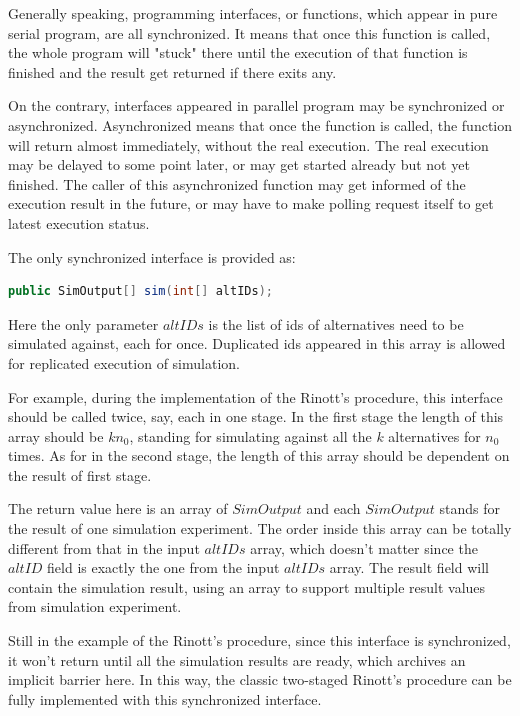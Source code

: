 Generally speaking, programming interfaces, or functions, which appear in pure serial program, are all synchronized. It means that once this function is called, the whole program will "stuck" there until the execution of that function is finished and the result get returned if there exits any.

On the contrary, interfaces appeared in parallel program may be synchronized or asynchronized. Asynchronized means that once the function is called, the function will return almost immediately, without the real execution. The real execution may be delayed to some point later, or may get started already but not yet finished. The caller of this asynchronized function may get informed of the execution result in the future, or may have to make polling request itself to get latest execution status.

The only synchronized interface is provided as:

\begin{lstlisting}[language=Java]
public SimOutput[] sim(int[] altIDs);
\end{lstlisting}

Here the only parameter $altIDs$ is the list of ids of alternatives need to be simulated against, each for once. Duplicated ids appeared in this array is allowed for replicated execution of simulation.

For example, during the implementation of the Rinott's procedure, this interface should be called twice, say, each in one stage. In the first stage the length of this array should be $kn_0$, standing for simulating against all the $k$ alternatives for $n_0$ times. As for in the second stage, the length of this array should be dependent on the result of first stage.

The return value here is an array of $SimOutput$ and each $SimOutput$ stands for the result of one simulation experiment. The order inside this array can be totally different from that in the input $altIDs$ array, which doesn't matter since the $altID$ field is exactly the one from the input $altIDs$ array. The result field will contain the simulation result, using an array to support multiple result values from simulation experiment.

Still in the example of the Rinott's procedure, since this interface is synchronized, it won't return until all the simulation results are ready, which archives an implicit barrier here. In this way, the classic two-staged Rinott's procedure can be fully implemented with this synchronized interface.

